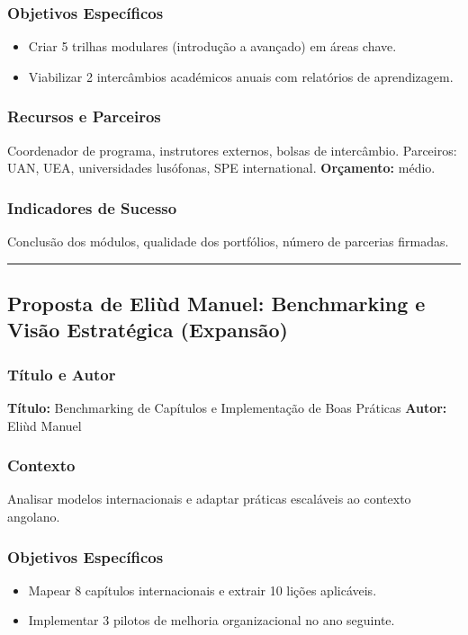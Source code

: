 \documentclass[12pt,a4paper]{article}
\newcommand{\proposalsep}{%
  \vspace{6pt}%
  {\color{gold}\rule{0.35\linewidth}{0.7pt}}%
  \vspace{4pt}%
}
\begin{document}
\subsubsection*{Objetivos Específicos}
\begin{itemize}
    \item Criar 5 trilhas modulares (introdução a avançado) em áreas chave.
    \item Viabilizar 2 intercâmbios académicos anuais com relatórios de aprendizagem.
\end{itemize}

\subsubsection*{Recursos e Parceiros}
Coordenador de programa, instrutores externos, bolsas de intercâmbio. Parceiros: UAN, UEA, universidades lusófonas, SPE international. \textbf{Orçamento:} médio.

\subsubsection*{Indicadores de Sucesso}
Conclusão dos módulos, qualidade dos portfólios, número de parcerias firmadas.

\proposalsep

\subsection{Proposta de Eliùd Manuel: Benchmarking e Visão Estratégica (Expansão)}

\subsubsection*{Título e Autor}
\textbf{Título:} Benchmarking de Capítulos e Implementação de Boas Práticas \quad \textbf{Autor:} Eliùd Manuel

\subsubsection*{Contexto}
Analisar modelos internacionais e adaptar práticas escaláveis ao contexto angolano.

\subsubsection*{Objetivos Específicos}
\begin{itemize}
    \item Mapear 8 capítulos internacionais e extrair 10 lições aplicáveis.
    \item Implementar 3 pilotos de melhoria organizacional no ano seguinte.
\end{itemize}
\end{document}
